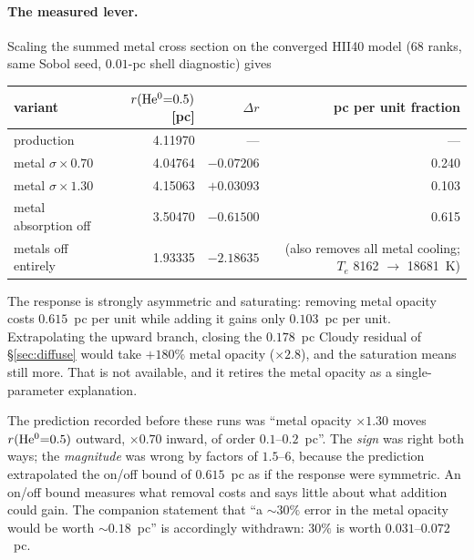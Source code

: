 \documentclass[english,a4paper]{my_memo}
\begin{document}
\paragraph{The measured lever.}  Scaling the summed metal cross section on
the converged HII40 model (68 ranks, same Sobol seed, $0.01$-pc shell
diagnostic) gives
\begin{center}\small
\begin{tabular}{@{}lrrr@{}}
\toprule
variant & $r({\rm He^0}{=}0.5)$ [pc] & $\Delta r$ & pc per unit fraction \\
\midrule
production                 & 4.11970 & ---      & ---   \\
metal $\sigma \times 0.70$ & 4.04764 & $-0.07206$ & 0.240 \\
metal $\sigma \times 1.30$ & 4.15063 & $+0.03093$ & 0.103 \\
metal absorption off       & 3.50470 & $-0.61500$ & 0.615 \\
metals off entirely        & 1.93335 & $-2.18635$ & (also removes all metal
  cooling; $T_e$ 8162 $\to$ 18681~K) \\
\bottomrule
\end{tabular}
\end{center}
The response is strongly asymmetric and saturating: removing metal opacity
costs $0.615$~pc per unit while adding it gains only $0.103$~pc per unit.
Extrapolating the upward branch, closing the $0.178$~pc Cloudy residual of
\S\ref{sec:diffuse} would take $+180\%$ metal opacity ($\times 2.8$), and the
saturation means still more.  That is not available, and it retires the
metal opacity as a single-parameter explanation.

The prediction recorded before these runs was ``metal opacity $\times 1.30$
moves $r({\rm He^0}{=}0.5)$ outward, $\times 0.70$ inward, of order
$0.1$--$0.2$~pc''.  The \emph{sign} was right both ways; the
\emph{magnitude} was wrong by factors of $1.5$--$6$, because the prediction
extrapolated the on/off bound of $0.615$~pc as if the response were
symmetric.  An on/off bound measures what removal costs and says little
about what addition could gain.  The companion statement that ``a ${\sim}30\%$
error in the metal opacity would be worth ${\sim}0.18$~pc'' is accordingly
withdrawn: $30\%$ is worth $0.031$--$0.072$~pc.
\end{document}
